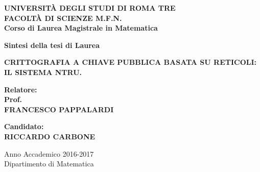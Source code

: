 \documentclass[a4paper,12pt]{report}
\theoremstyle{plain}
\theoremstyle{definition}
\theoremstyle{remark}
\begin{document}
\begin{titlepage}
\begin{center}

{\small{\bf UNIVERSIT\`A DEGLI STUDI DI ROMA TRE \\ FACOLT\`A DI SCIENZE M.F.N.\\
Corso di Laurea Magistrale in Matematica}}

\end{center}


\vspace{40 mm}




\centerline{\vspace{5mm} {\large{\bf Sintesi della tesi di Laurea}}}
\begin{center}
\vspace{5mm}


{\Large{\bf 	CRITTOGRAFIA A CHIAVE PUBBLICA BASATA SU RETICOLI: IL SISTEMA NTRU.}} \\
\vspace{5mm}

\vspace{3mm}


\end{center}
\vspace{35mm}
\par
\noindent
\begin{minipage}[t]{0.47\textwidth}
{\large{\bf Relatore:\\
Prof.\\
FRANCESCO PAPPALARDI}}
\end{minipage}
\hfill
\begin{minipage}[t]{0.47\textwidth}\raggedleft
{\large{\bf Candidato:\\
RICCARDO CARBONE}
}
\end{minipage}
\vspace{20 mm}
\begin{center}
{\large{Anno Accademico 2016-2017}\\
Dipartimento di Matematica}

\end{center}

\end{titlepage}


\end{document}
